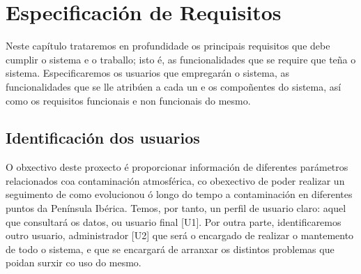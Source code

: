 \chapter{Especificación de Requisitos}


Neste capítulo trataremos en profundidade os principais requisitos que debe cumplir o sistema e o traballo; isto é, as funcionalidades que se require que teña o sistema.
Especificaremos os usuarios que empregarán o sistema, as funcionalidades que se lle atribúen a cada un e os compoñentes do sistema, así como os requisitos funcionais e non
funcionais do mesmo.

\section{Identificación dos usuarios}\label{usuarios}
O obxectivo deste proxecto é proporcionar información de diferentes parámetros relacionados coa contaminación atmosférica, co obexectivo de poder realizar un seguimento de
como evolucionou ó longo do tempo a contaminación en diferentes puntos da Península Ibérica. Temos, por tanto, un perfil de usuario claro: aquel que consultará os datos, ou
usuario final [U1]. Por outra parte, identificaremos outro usuario, administrador [U2] que será o encargado de realizar o mantemento de todo o sistema, e que se encargará de arranxar os
distintos problemas que poidan surxir co uso do mesmo.

